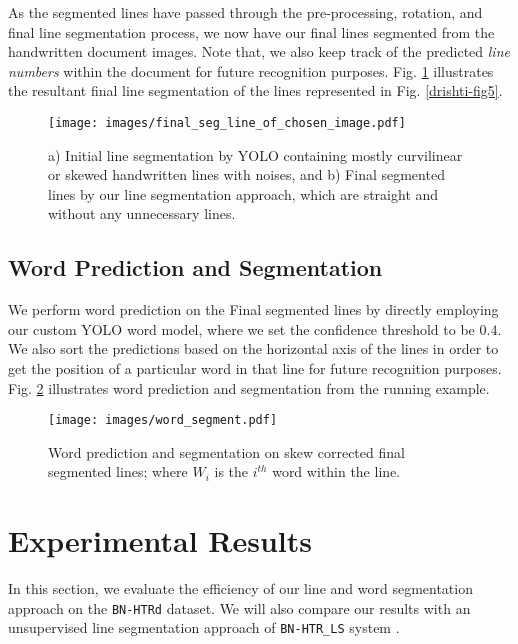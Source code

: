 \documentclass[runningheads]{llncs}
\begin{document}
\noindent As the segmented lines have passed through the pre-processing, rotation, and final line segmentation process, we now have our final lines segmented from the handwritten document images. Note that, we also keep track of the predicted \textit{line numbers} within the document for future recognition purposes. Fig. \ref{drishti-fig12} illustrates the resultant final line segmentation of the lines represented in Fig. \ref{drishti-fig5}.

 \begin{figure}[!h]
    \vspace{-4mm}
    \centering
\texttt{[image: images/final\_seg\_line\_of\_chosen\_image.pdf]}
    \vspace{-6mm}
    \caption{a) Initial line segmentation by YOLO containing mostly curvilinear or skewed handwritten lines with noises, and b) Final segmented lines by our line segmentation approach, which are straight and without any unnecessary lines.} 
    \label{drishti-fig12}
\end{figure}


\subsection{Word Prediction and Segmentation}
\label{sec_4_5}
We perform word prediction on the Final segmented lines by directly employing our custom YOLO word model, where we set the confidence threshold to be $0.4$. We also sort the predictions based on the horizontal axis of the lines in order to get the position of a particular word in that line for future recognition purposes. Fig. \ref{drishti-fig13} illustrates word prediction and segmentation from the running example.

\begin{figure}
    \vspace{-4mm}
    \centering
    \texttt{[image: images/word\_segment.pdf]}
    \vspace{-6mm}
    \caption{Word prediction and segmentation on skew corrected final segmented lines; where \textbf{$W_i$} is the $i^{th}$ word within the line.} 
    \label{drishti-fig13}
    \vspace{-10mm}
\end{figure}

\section{Experimental Results}
\vspace{-2mm}
In this section, we evaluate the efficiency of our line and word segmentation approach on the \texttt{BN-HTRd} dataset. We will also compare our results with an unsupervised line segmentation approach of \texttt{BN-HTR\_LS} system \cite{rahman2023bn}. 
\end{document}
